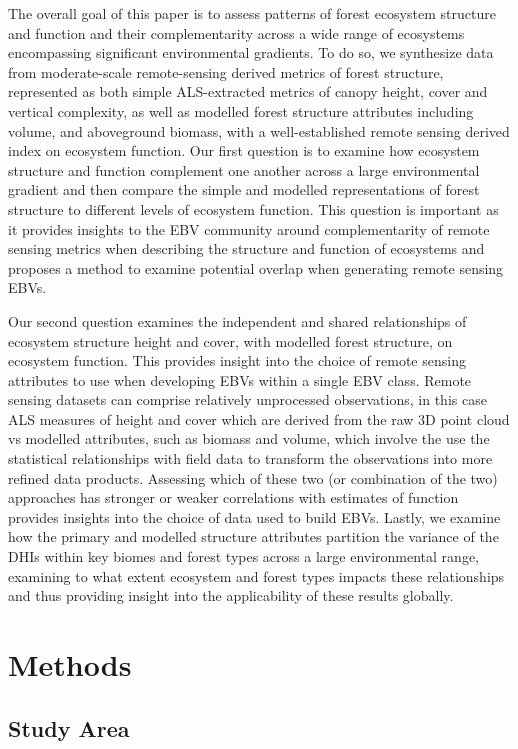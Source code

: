 \documentclass[
  authoryear,
  review,
  3p,
  twocolumn]{elsarticle}
\begin{document}
The overall goal of this paper is to assess patterns of forest ecosystem
structure and function and their complementarity across a wide range of
ecosystems encompassing significant environmental gradients. To do so,
we synthesize data from moderate-scale remote-sensing derived metrics of
forest structure, represented as both simple ALS-extracted metrics of
canopy height, cover and vertical complexity, as well as modelled forest
structure attributes including volume, and aboveground biomass, with a
well-established remote sensing derived index on ecosystem function. Our
first question is to examine how ecosystem structure and function
complement one another across a large environmental gradient and then
compare the simple and modelled representations of forest structure to
different levels of ecosystem function. This question is important as it
provides insights to the EBV community around complementarity of remote
sensing metrics when describing the structure and function of ecosystems
and proposes a method to examine potential overlap when generating
remote sensing EBVs.

Our second question examines the independent and shared relationships of
ecosystem structure height and cover, with modelled forest structure, on
ecosystem function. This provides insight into the choice of remote
sensing attributes to use when developing EBVs within a single EBV
class. Remote sensing datasets can comprise relatively unprocessed
observations, in this case ALS measures of height and cover which are
derived from the raw 3D point cloud vs modelled attributes, such as
biomass and volume, which involve the use the statistical relationships
with field data to transform the observations into more refined data
products. Assessing which of these two (or combination of the two)
approaches has stronger or weaker correlations with estimates of
function provides insights into the choice of data used to build EBVs.
Lastly, we examine how the primary and modelled structure attributes
partition the variance of the DHIs within key biomes and forest types
across a large environmental range, examining to what extent ecosystem
and forest types impacts these relationships and thus providing insight
into the applicability of these results globally.

\hypertarget{methods}{%
\section{Methods}\label{methods}}

\hypertarget{sec-study-area}{%
\subsection{Study Area}\label{sec-study-area}}
\end{document}
